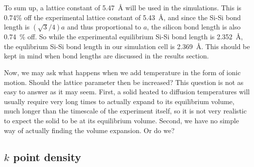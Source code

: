 \documentclass[11pt,bibliography=totoc,index=totoc]{scrbook}   %
\begin{document}

To sum up, a lattice constant of 5.47~Å  will be used in the simulations. 
This is 0.74\% off the experimental lattice constant of 5.43~Å, and since the Si-Si bond length is $(\sqrt{3}/4)a$ and thus proportional to $a$, 
the silicon bond length is also 0.74~\% off.
So while the experimental equilibrium Si-Si bond length is \SI{2.352}{\angstrom}, the equlibrium Si-Si bond length in our simulation cell is \SI{2.369}{\angstrom}.
This should be kept in mind when bond lengths are discussed in the results section.

Now, we may ask what happens when we add temperature in the form of ionic motion.
Should the lattice parameter then be increased? 
This question is not as easy to answer as it may seem.
First, a solid heated to diffusion temperatures will usually require very long times to actually expand to its equilibrium volume, much longer than the timescale of the experiment itself, so it is not very realistic to expect the solid to be at its equilibrium volume.
Second, we have no simple way of actually finding the volume expansion. Or do we?




%
\subsection{$k$ point density}\label{sec:parameters:k}
%
\end{document}
